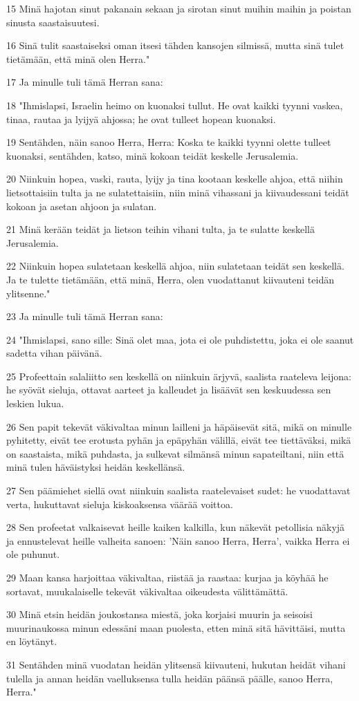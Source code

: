 \par 15 Minä hajotan sinut pakanain sekaan ja sirotan sinut muihin maihin ja poistan sinusta saastaisuutesi.
\par 16 Sinä tulit saastaiseksi oman itsesi tähden kansojen silmissä, mutta sinä tulet tietämään, että minä olen Herra."
\par 17 Ja minulle tuli tämä Herran sana:
\par 18 "Ihmislapsi, Israelin heimo on kuonaksi tullut. He ovat kaikki tyynni vaskea, tinaa, rautaa ja lyijyä ahjossa; he ovat tulleet hopean kuonaksi.
\par 19 Sentähden, näin sanoo Herra, Herra: Koska te kaikki tyynni olette tulleet kuonaksi, sentähden, katso, minä kokoan teidät keskelle Jerusalemia.
\par 20 Niinkuin hopea, vaski, rauta, lyijy ja tina kootaan keskelle ahjoa, että niihin lietsottaisiin tulta ja ne sulatettaisiin, niin minä vihassani ja kiivaudessani teidät kokoan ja asetan ahjoon ja sulatan.
\par 21 Minä kerään teidät ja lietson teihin vihani tulta, ja te sulatte keskellä Jerusalemia.
\par 22 Niinkuin hopea sulatetaan keskellä ahjoa, niin sulatetaan teidät sen keskellä. Ja te tulette tietämään, että minä, Herra, olen vuodattanut kiivauteni teidän ylitsenne."
\par 23 Ja minulle tuli tämä Herran sana:
\par 24 "Ihmislapsi, sano sille: Sinä olet maa, jota ei ole puhdistettu, joka ei ole saanut sadetta vihan päivänä.
\par 25 Profeettain salaliitto sen keskellä on niinkuin ärjyvä, saalista raateleva leijona: he syövät sieluja, ottavat aarteet ja kalleudet ja lisäävät sen keskuudessa sen leskien lukua.
\par 26 Sen papit tekevät väkivaltaa minun lailleni ja häpäisevät sitä, mikä on minulle pyhitetty, eivät tee erotusta pyhän ja epäpyhän välillä, eivät tee tiettäväksi, mikä on saastaista, mikä puhdasta, ja sulkevat silmänsä minun sapateiltani, niin että minä tulen häväistyksi heidän keskellänsä.
\par 27 Sen päämiehet siellä ovat niinkuin saalista raatelevaiset sudet: he vuodattavat verta, hukuttavat sieluja kiskoaksensa väärää voittoa.
\par 28 Sen profeetat valkaisevat heille kaiken kalkilla, kun näkevät petollisia näkyjä ja ennustelevat heille valheita sanoen: 'Näin sanoo Herra, Herra', vaikka Herra ei ole puhunut.
\par 29 Maan kansa harjoittaa väkivaltaa, riistää ja raastaa: kurjaa ja köyhää he sortavat, muukalaiselle tekevät väkivaltaa oikeudesta välittämättä.
\par 30 Minä etsin heidän joukostansa miestä, joka korjaisi muurin ja seisoisi muurinaukossa minun edessäni maan puolesta, etten minä sitä hävittäisi, mutta en löytänyt.
\par 31 Sentähden minä vuodatan heidän ylitsensä kiivauteni, hukutan heidät vihani tulella ja annan heidän vaelluksensa tulla heidän päänsä päälle, sanoo Herra, Herra."

